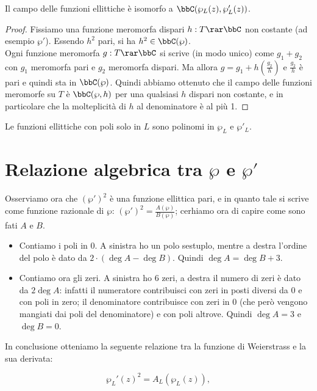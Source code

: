\begin{teorema}
    Il campo delle funzioni ellittiche è isomorfo a $\bbC(\wp_L(z),\wp'_L(z))$.
\end{teorema}
\begin{proof}
    Fissiamo una funzione meromorfa dispari $h:T\rar\bbC$ non costante (ad esempio $\wp'$).
    Essendo $h^2$ pari, si ha $h^2\in\bbC(\wp)$.\\
    Ogni funzione meromorfa $g:T\rar\bbC$ si scrive (in modo unico) come $g_1+g_2$ con $g_1$ meromorfa pari e $g_2$ meromorfa dispari.
    Ma allora $g=g_1+h(\frac{g_2}{h})$ e $\frac{g_2}{h}$ è pari e quindi sta in $\bbC(\wp)$.
    Quindi abbiamo ottenuto che il campo delle funzioni meromorfe su $T$ è $\bbC(\wp,h)$ per una qualsiasi $h$ dispari non costante, e in particolare che la molteplicità di $h$ al denominatore è al più 1.
\end{proof}

\begin{corollario}
    Le funzioni ellittiche con poli solo in $L$ sono polinomi in $\wp_L$ e $\wp'_L$.
\end{corollario}



\section{Relazione algebrica tra $\wp$ e $\wp'$}
Osserviamo ora che $(\wp')^2$ è una funzione ellittica pari, e in quanto tale si scrive come funzione razionale di $\wp$:
$(\wp')^2=\frac{A(\wp)}{B(\wp)}$; cerhiamo ora di capire come sono fati $A$ e $B$.

\begin{itemize}
 \item Contiamo i poli in 0. A sinistra ho un polo sestuplo, mentre a destra l'ordine del polo è dato da $2\cdot (\deg A - \deg B)$. Quindi $\deg A = \deg B + 3$.
 \item Contiamo ora gli zeri. A sinistra ho 6 zeri, a destra il numero di zeri è dato da $2 \deg A$: infatti il numeratore contribuisci con zeri in posti diversi da 0 e con poli in zero; il denominatore contribuisce con zeri in 0 (che però vengono mangiati dai poli del denominatore) e con poli altrove. Quindi $\deg A = 3$ e $\deg B = 0$.
\end{itemize}

In conclusione otteniamo la seguente relazione tra la funzione di Weierstrass e la sua derivata:

\[
	\wp_L'(z)^2 = A_L(\wp_L(z)),
\]

